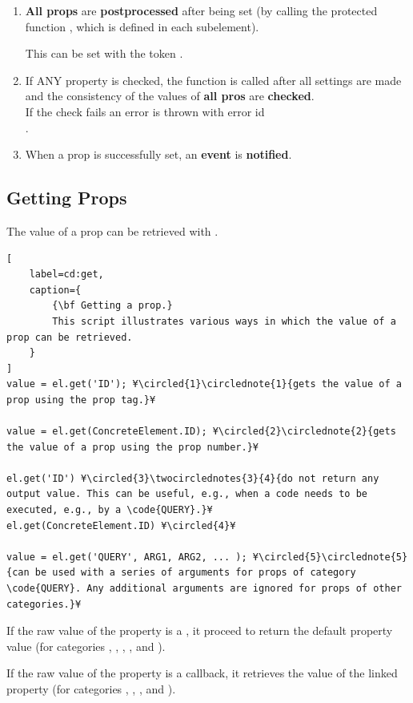 \documentclass{tufte-handout}
\begin{document}
\begin{enumerate}
	\item {\bf All props} are {\bf postprocessed} after being set (by calling the protected function , which is defined in each subelement).
	
	This can be set with the token .

	\item If ANY property is checked, the function  is called after all settings are made and the consistency of the values of {\bf all pros} are {\bf checked}.\\
	If the check fails an error is thrown with error id\\
	.
	
	\item When a prop is successfully set, an {\bf event}  is {\bf notified}.
\end{enumerate} 

\subsection{Getting Props}

The value of a prop can be retrieved with .
%
\begin{lstlisting}[
	label=cd:get,
	caption={
		{\bf Getting a prop.}
		This script illustrates various ways in which the value of a prop can be retrieved.
	}
]
value = el.get('ID'); ¥\circled{1}\circlednote{1}{gets the value of a prop using the prop tag.}¥

value = el.get(ConcreteElement.ID); ¥\circled{2}\circlednote{2}{gets the value of a prop using the prop number.}¥

el.get('ID') ¥\circled{3}\twocirclednotes{3}{4}{do not return any output value. This can be useful, e.g., when a code needs to be executed, e.g., by a \code{QUERY}.}¥
el.get(ConcreteElement.ID) ¥\circled{4}¥

value = el.get('QUERY', ARG1, ARG2, ... ); ¥\circled{5}\circlednote{5}{can be used with a series of arguments for props of category \code{QUERY}. Any additional arguments are ignored for props of other categories.}¥
\end{lstlisting}

If the raw value of the property is a , it proceed to return the default property value (for categories , , , , and ).
 
If the raw value of the property is a callback, it retrieves the value of the linked property (for categories , , , and ).
 
\end{document}
